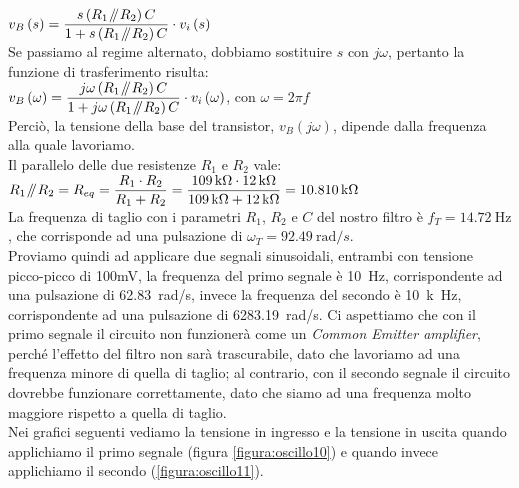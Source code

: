 \documentclass{report}
\newcommand{\parallelsum}{\mathbin{\!/\mkern-5mu/\!}}
\begin{document}
\\[2pt]\indent $\displaystyle{v_B\left(s\right)=\frac{s\left(R_1\parallelsum R_2\right)C}{1+s\left(R_1\parallelsum R_2\right)C}\cdot v_i\left(s\right)}$
\\[2pt]Se passiamo al regime alternato, dobbiamo sostituire $s$ con $j\omega$, pertanto la funzione di trasferimento risulta: 
\\[2pt]\indent $\displaystyle{v_B\left(\omega\right)=\frac{j\omega\left(R_1\parallelsum R_2\right)C}{1+j\omega\left(R_1\parallelsum R_2\right)C}\cdot v_i\left(\omega\right)}$, con $\displaystyle{\omega=2\pi f}$
\\[2pt]Perciò, la tensione della base del transistor, $v_B\left(j\omega\right)$, dipende dalla frequenza alla quale lavoriamo.
\\Il parallelo delle due resistenze $R_1$ e $R_2$ vale:
\\[2pt]\indent $\displaystyle{R_1\parallelsum R_2=R_{eq}=\frac{R_1\cdot R_2}{R_1+R_2}=\frac{\SI{109}{k\ohm}\cdot\SI{12}{k\ohm}}{\SI{109}{k\ohm}+\SI{12}{k\ohm}}=\SI{10.810}{k\ohm}}$
\\[2pt]La frequenza di taglio con i parametri $R_1$, $R_2$ e $C$ del nostro filtro è $f_T=\SI{14.72}{\hertz}$, che corrisponde ad una pulsazione di $\omega_T=\SI{92.49}{\radian/s}$. 
\\\indent Proviamo quindi ad applicare due segnali sinusoidali, entrambi con tensione picco-picco di 100mV, la frequenza del primo segnale è \SI{10}{\hertz}, corrispondente ad una pulsazione di \SI{62.83}{\radian/s}, invece la frequenza del secondo è \SI{10}{k\hertz}, corrispondente ad una pulsazione di \SI{6283.19}{\radian/s}. Ci aspettiamo che con il primo segnale il circuito non funzionerà come un \textit{Common Emitter amplifier}, perché l'effetto del filtro non sarà trascurabile, dato che lavoriamo ad una frequenza minore di quella di taglio; al contrario, con il secondo segnale il circuito dovrebbe funzionare correttamente, dato che siamo ad una frequenza molto maggiore rispetto a quella di taglio.
\\\indent Nei grafici seguenti vediamo la tensione in ingresso e la tensione in uscita quando applichiamo il primo segnale (figura \ref{figura:oscillo10}) e quando invece applichiamo il secondo (\ref{figura:oscillo11}).
\end{document}
